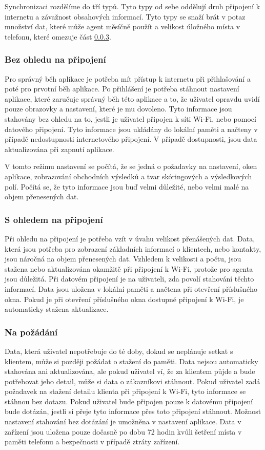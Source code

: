 \documentclass[11pt,twoside,a4paper]{book}
\begin{document}
Synchronizaci rozdělíme do tří typů. Tyto typy od sebe oddělují druh připojení k internetu a závažnost obsahových informací. Tyto typy se snaží brát v potaz množství dat, které může agent měsíčně použít a velikost úložného místa v telefonu, které omezuje část \ref{sec:request}. 

\subsubsection{Bez ohledu na připojení}
Pro správný běh aplikace je potřeba mít přístup k internetu při přihlašování a poté pro prvotní běh aplikace. Po přihlášení je potřeba stáhnout nastavení aplikace, které zaručuje správný běh této aplikace a to, že uživatel opravdu uvidí pouze obrazovky a nastavení, které je mu dovoleno. Tyto informace jsou stahovány bez ohledu na to, jestli je uživatel připojen k síti Wi-Fi, nebo pomocí datového připojení. Tyto informace jsou ukládány do lokální paměti a načteny v případě nedostupnosti internetového připojení. V případě dostupnosti, jsou data aktualizována při zapnutí aplikace.

V tomto režimu nastavení se počítá, že se jedná o požadavky na nastavení, oken aplikace, zobrazování obchodních výsledků a tvar skóringových a výsledkových polí. Počítá se, že tyto informace jsou buď velmi důležité, nebo velmi malé na objem přenesených dat.

\subsubsection{S ohledem na připojení}
Při ohledu na připojení je potřeba vzít v úvahu velikost přenášených dat. Data, která jsou potřeba pro zobrazení základních informací o klientech, nebo kontakty, jsou náročná na objem přenesených dat. Vzhledem k velikosti a počtu, jsou stažena nebo aktualizována okamžitě při připojení k Wi-Fi, protože pro agenta jsou důležitá. Při datovém připojení je na uživateli, zda povolí stahování těchto informací. Data jsou uložena v lokální paměti a načtena při otevření příslušného okna. Pokud je při otevření příslušného okna dostupné připojení k Wi-Fi, je automaticky stažena aktualizace.

\subsubsection{Na požádání} \label{sec:request}
Data, která uživatel nepotřebuje do té doby, dokud se neplánuje setkat s klientem, může si později požádat o stažení do paměti. Data nejsou automaticky stahována ani aktualizována, ale pokud uživatel ví, že za klientem půjde a bude potřebovat jeho detail, může si data o zákazníkovi stáhnout. Pokud uživatel zadá požadavek na stažení detailu klienta při připojení k Wi-Fi, tyto informace se stáhnou bez dotazu. Pokud uživatel bude připojen pouze k datovému připojení bude dotázán, jestli si přeje tyto informace přes toto připojení stáhnout. Možnost nastavení stahování bez dotázání je umožněna v nastavení aplikace. Data v zařízení jsou uložena pouze dočasně po dobu 72 hodin kvůli šetření místa v paměti telefonu a bezpečnosti v případě ztráty zařízení.
\end{document}
